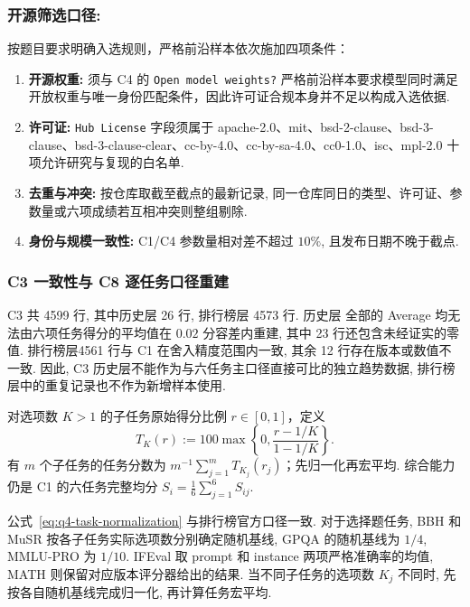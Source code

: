\subsubsection{开源筛选口径:}按题目要求明确入选规则，严格前沿样本依次施加四项条件：
\begin{enumerate}[label=\textbf{(\roman*)},leftmargin=*,itemsep=0pt,topsep=0pt]
\item \textbf{开源权重:} 须与 C4 的 \texttt{Open model weights?} 严格前沿样本要求模型同时满足开放权重与唯一身份匹配条件，因此许可证合规本身并不足以构成入选依据.
\item \textbf{许可证:} \texttt{Hub License} 字段须属于 apache-2.0、mit、bsd-2-clause、bsd-3-clause、bsd-3-clause-clear、cc-by-4.0、cc-by-sa-4.0、cc0-1.0、isc、mpl-2.0 十项允许研究与复现的白名单.
 \item \textbf{去重与冲突:} 按仓库取截至截点的最新记录, 同一仓库同日的类型、许可证、参数量或六项成绩若互相冲突则整组剔除.
\item \textbf{身份与规模一致性:} C1/C4 参数量相对差不超过 $10\%$, 且发布日期不晚于截点.
\end{enumerate}



\subsubsection{C3 一致性与 C8 逐任务口径重建}
C3 共 4599 行, 其中历史层 26 行, 排行榜层 4573 行. 历史层 全部的 Average 均无法由六项任务得分的平均值在 $0.02$ 分容差内重建, 其中 23 行还包含未经证实的零值. 排行榜层4561 行与 C1 在舍入精度范围内一致, 其余 12 行存在版本或数值不一致. 因此, C3 历史层不能作为与六任务主口径直接可比的独立趋势数据, 排行榜层中的重复记录也不作为新增样本使用.

\begin{definition}[随机猜测基线归一化与任务宏平均]\label{def:q4-task-normalization}
对选项数 $K>1$ 的子任务原始得分比例 $r\in[0,1]$，定义
\begin{equation}\label{eq:q4-task-normalization}
T_K(r):=100\max\left\{0,\frac{r-1/K}{1-1/K}\right\}.
\end{equation}
有 $m$ 个子任务的任务分数为 $m^{-1}\sum_{j=1}^mT_{K_j}(r_j)$；先归一化再宏平均. 综合能力仍是 C1 的六任务完整均分 $S_i=\frac16\sum_{j=1}^6S_{ij}$. 
\end{definition}

公式~\eqref{eq:q4-task-normalization} 与排行榜官方口径一致\cite{hf_normalization}. 对于选择题任务, BBH 和 MuSR 按各子任务实际选项数分别确定随机基线, GPQA 的随机基线为 $1/4$, MMLU-PRO 为 $1/10$. IFEval 取 prompt 和 instance 两项严格准确率的均值, MATH 则保留对应版本评分器给出的结果. 当不同子任务的选项数 $K_j$ 不同时, 先按各自随机基线完成归一化, 再计算任务宏平均.


